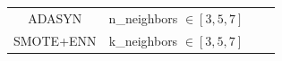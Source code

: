 \documentclass[ida]{iosart2x}
\begin{document}
\begin{table}[tb]
\begin{tabular}{cccc}
  ADASYN           & \multicolumn{1}{c|}{n\_neighbors $\in [3,5,7]$}                                                                                                                                                         &                                                       &                                                                                                                                                              \\ \cline{1-2}
  SMOTE+ENN        & \multicolumn{1}{c|}{k\_neighbors $\in [3,5,7]$}                                                                                                                                                         &                                                       &                                                                                                                                                              \\ \hline
  \end{tabular}
  \end{table}
\end{document}
